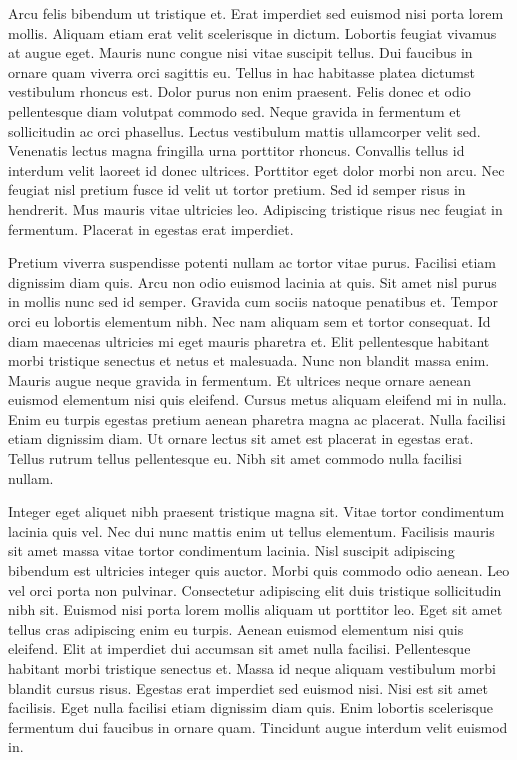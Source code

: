\documentclass[11pt,a4paper]{article}
\begin{document}
Arcu felis bibendum ut tristique et. Erat imperdiet sed euismod nisi porta lorem mollis. Aliquam etiam erat velit scelerisque in dictum. Lobortis feugiat vivamus at augue eget. Mauris nunc congue nisi vitae suscipit tellus. Dui faucibus in ornare quam viverra orci sagittis eu. Tellus in hac habitasse platea dictumst vestibulum rhoncus est. Dolor purus non enim praesent. Felis donec et odio pellentesque diam volutpat commodo sed. Neque gravida in fermentum et sollicitudin ac orci phasellus. Lectus vestibulum mattis ullamcorper velit sed. Venenatis lectus magna fringilla urna porttitor rhoncus. Convallis tellus id interdum velit laoreet id donec ultrices. Porttitor eget dolor morbi non arcu. Nec feugiat nisl pretium fusce id velit ut tortor pretium. Sed id semper risus in hendrerit. Mus mauris vitae ultricies leo. Adipiscing tristique risus nec feugiat in fermentum. Placerat in egestas erat imperdiet.

Pretium viverra suspendisse potenti nullam ac tortor vitae purus. Facilisi etiam dignissim diam quis. Arcu non odio euismod lacinia at quis. Sit amet nisl purus in mollis nunc sed id semper. Gravida cum sociis natoque penatibus et. Tempor orci eu lobortis elementum nibh. Nec nam aliquam sem et tortor consequat. Id diam maecenas ultricies mi eget mauris pharetra et. Elit pellentesque habitant morbi tristique senectus et netus et malesuada. Nunc non blandit massa enim. Mauris augue neque gravida in fermentum. Et ultrices neque ornare aenean euismod elementum nisi quis eleifend. Cursus metus aliquam eleifend mi in nulla. Enim eu turpis egestas pretium aenean pharetra magna ac placerat. Nulla facilisi etiam dignissim diam. Ut ornare lectus sit amet est placerat in egestas erat. Tellus rutrum tellus pellentesque eu. Nibh sit amet commodo nulla facilisi nullam.

Integer eget aliquet nibh praesent tristique magna sit. Vitae tortor condimentum lacinia quis vel. Nec dui nunc mattis enim ut tellus elementum. Facilisis mauris sit amet massa vitae tortor condimentum lacinia. Nisl suscipit adipiscing bibendum est ultricies integer quis auctor. Morbi quis commodo odio aenean. Leo vel orci porta non pulvinar. Consectetur adipiscing elit duis tristique sollicitudin nibh sit. Euismod nisi porta lorem mollis aliquam ut porttitor leo. Eget sit amet tellus cras adipiscing enim eu turpis. Aenean euismod elementum nisi quis eleifend. Elit at imperdiet dui accumsan sit amet nulla facilisi. Pellentesque habitant morbi tristique senectus et. Massa id neque aliquam vestibulum morbi blandit cursus risus. Egestas erat imperdiet sed euismod nisi. Nisi est sit amet facilisis. Eget nulla facilisi etiam dignissim diam quis. Enim lobortis scelerisque fermentum dui faucibus in ornare quam. Tincidunt augue interdum velit euismod in.
\end{document}

